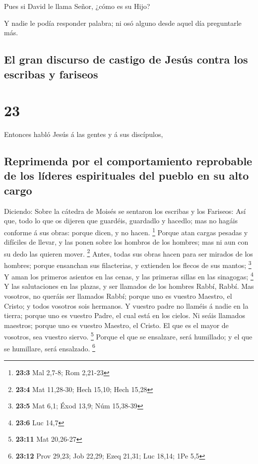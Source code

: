  Pues si David le llama Señor, ¿cómo es su Hijo?

 Y nadie le podía responder palabra; ni osó alguno desde
aquel día preguntarle más.

\hypertarget{el-gran-discurso-de-castigo-de-jesuxfas-contra-los-escribas-y-fariseos}{%
\subsection{El gran discurso de castigo de Jesús contra los escribas y
fariseos}\label{el-gran-discurso-de-castigo-de-jesuxfas-contra-los-escribas-y-fariseos}}

\hypertarget{section-22}{%
\section{23}\label{section-22}}

 Entonces habló Jesús á las gentes y á sus discípulos,

\hypertarget{reprimenda-por-el-comportamiento-reprobable-de-los-luxedderes-espirituales-del-pueblo-en-su-alto-cargo}{%
\subsection{Reprimenda por el comportamiento reprobable de los líderes
espirituales del pueblo en su alto
cargo}\label{reprimenda-por-el-comportamiento-reprobable-de-los-luxedderes-espirituales-del-pueblo-en-su-alto-cargo}}

 Diciendo: Sobre la cátedra de Moisés se sentaron los
escribas y los Fariseos:  Así que, todo lo que os dijeren
que guardéis, guardadlo y hacedlo; mas no hagáis conforme á sus obras:
porque dicen, y no hacen. \footnote{\textbf{23:3} Mal 2,7-8; Rom 2,21-23}
 Porque atan cargas pesadas y difíciles de llevar, y las
ponen sobre los hombros de los hombres; mas ni aun con su dedo las
quieren mover. \footnote{\textbf{23:4} Mat 11,28-30; Hech 15,10; Hech
  15,28}  Antes, todas sus obras hacen para ser mirados de
los hombres; porque ensanchan sus filacterias, y extienden los flecos de
sus mantos; \footnote{\textbf{23:5} Mat 6,1; Éxod 13,9; Núm 15,38-39}
 Y aman los primeros asientos en las cenas, y las primeras
sillas en las sinagogas; \footnote{\textbf{23:6} Luc 14,7}
 Y las salutaciones en las plazas, y ser llamados de los
hombres Rabbí, Rabbí.  Mas vosotros, no queráis ser
llamados Rabbí; porque uno es vuestro Maestro, el Cristo; y todos
vosotros sois hermanos.  Y vuestro padre no llaméis á
nadie en la tierra; porque uno es vuestro Padre, el cual está en los
cielos.  Ni seáis llamados maestros; porque uno es
vuestro Maestro, el Cristo.  El que es el mayor de
vosotros, sea vuestro siervo. \footnote{\textbf{23:11} Mat 20,26-27}
 Porque el que se ensalzare, será humillado; y el que se
humillare, será ensalzado. \footnote{\textbf{23:12} Prov 29,23; Job
  22,29; Ezeq 21,31; Luc 18,14; 1Pe 5,5}

